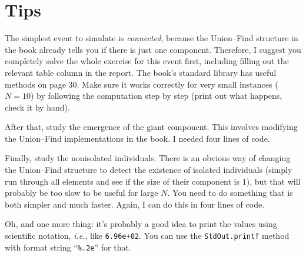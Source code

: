 \documentclass{tufte-handout}
\begin{document}
\section{Tips}

The simplest event to simulate is \emph{connected}, because
the Union--Find structure in the book already tells you if there is
just one component.
Therefore, I suggest you completely solve the whole exercise for this
event first, including filling out the relevant table column in the report.
The book's standard library has useful methods on page 30.
Make sure it works correctly for very small instances ($N=10$) by
following the computation step by step (print out what happens, check
it by hand).

After that, study the emergence of the giant component.
This involves modifying the Union--Find implementations in the book.
I needed four lines of code.

Finally, study the nonisolated individuals.
There is an obvious way of changing the Union--Find structure to detect
the existence of isolated individuals (simply run through all elements
and see if the size of their component is $1$), but that will probably
be too slow to be useful for large $N$.
You need to do something that is both simpler and much faster.
Again, I can do this in four lines of code.

Oh, and one more thing: it's probably a good idea to print the values
using scientific notation, \emph{i.e.}, like {\tt 6.96e+02}.
You can use the {\tt StdOut.printf} method with format string
``{\tt \%.2e}''  for that.
\end{document}
